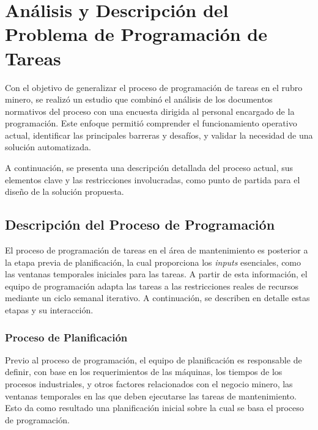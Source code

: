 \documentclass{article}
\begin{document}



\section{Análisis y Descripción del Problema de Programación de Tareas}

Con el objetivo de generalizar el proceso de programación de tareas en el rubro minero, se realizó un estudio que combinó el análisis de los documentos normativos del proceso con una encuesta dirigida al personal encargado de la programación. Este enfoque permitió comprender el funcionamiento operativo actual, identificar las principales barreras y desafíos, y validar la necesidad de una solución automatizada.

A continuación, se presenta una descripción detallada del proceso actual, sus elementos clave y las restricciones involucradas, como punto de partida para el diseño de la solución propuesta.


\subsection{Descripción del Proceso de Programación}

El proceso de programación de tareas en el área de mantenimiento es posterior a la etapa previa de planificación, la cual proporciona los \textit{inputs} esenciales, como las ventanas temporales iniciales para las tareas. A partir de esta información, el equipo de programación adapta las tareas a las restricciones reales de recursos mediante un ciclo semanal iterativo. A continuación, se describen en detalle estas etapas y su interacción.

\subsubsection{Proceso de Planificación}

Previo al proceso de programación, el equipo de planificación es responsable de definir, con base en los requerimientos de las máquinas, los tiempos de los procesos industriales, y otros factores relacionados con el negocio minero, las ventanas temporales en las que deben ejecutarse las tareas de mantenimiento. Esto da como resultado una planificación inicial sobre la cual se basa el proceso de programación.
\end{document}
